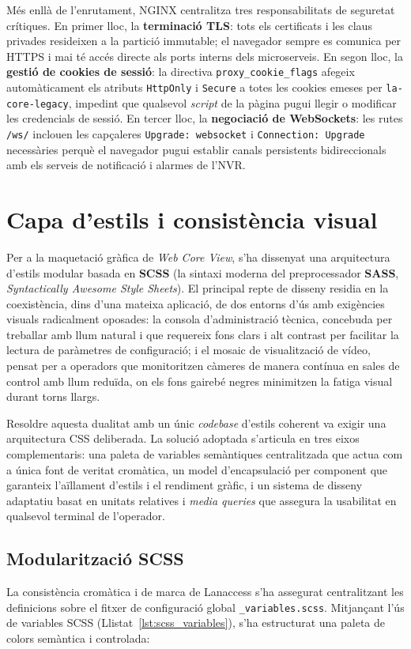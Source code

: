 Més enllà de l'enrutament, NGINX centralitza tres responsabilitats de seguretat crítiques. En primer lloc, la \textbf{terminació TLS}: tots els certificats i les claus privades resideixen a la partició immutable; el navegador sempre es comunica per HTTPS i mai té accés directe als ports interns dels microserveis. En segon lloc, la \textbf{gestió de cookies de sessió}: la directiva \texttt{proxy\_cookie\_flags} afegeix automàticament els atributs \texttt{HttpOnly} i \texttt{Secure} a totes les cookies emeses per \texttt{la-core-legacy}, impedint que qualsevol \textit{script} de la pàgina pugui llegir o modificar les credencials de sessió. En tercer lloc, la \textbf{negociació de WebSockets}: les rutes \texttt{/ws/} inclouen les capçaleres \texttt{Upgrade: websocket} i \texttt{Connection: Upgrade} necessàries perquè el navegador pugui establir canals persistents bidireccionals amb els serveis de notificació i alarmes de l'NVR.

\section{Capa d'estils i consistència visual}
Per a la maquetació gràfica de \textit{Web Core View}, s'ha dissenyat una arquitectura d'estils modular basada en \textbf{SCSS} (la sintaxi moderna del preprocessador \textbf{SASS}, \textit{Syntactically Awesome Style Sheets}). El principal repte de disseny residia en la coexistència, dins d'una mateixa aplicació, de dos entorns d'ús amb exigències visuals radicalment oposades: la consola d'administració tècnica, concebuda per treballar amb llum natural i que requereix fons clars i alt contrast per facilitar la lectura de paràmetres de configuració; i el mosaic de visualització de vídeo, pensat per a operadors que monitoritzen càmeres de manera contínua en sales de control amb llum reduïda, on els fons gairebé negres minimitzen la fatiga visual durant torns llargs.

Resoldre aquesta dualitat amb un únic \textit{codebase} d'estils coherent va exigir una arquitectura CSS deliberada. La solució adoptada s'articula en tres eixos complementaris: una paleta de variables semàntiques centralitzada que actua com a única font de veritat cromàtica, un model d'encapsulació per component que garanteix l'aïllament d'estils i el rendiment gràfic, i un sistema de disseny adaptatiu basat en unitats relatives i \textit{media queries} que assegura la usabilitat en qualsevol terminal de l'operador.

\subsection{Modularització SCSS}
La consistència cromàtica i de marca de Lanaccess s'ha assegurat centralitzant les definicions sobre el fitxer de configuració global \texttt{\_variables.scss}. Mitjançant l'ús de variables SCSS (Llistat~\ref{lst:scss_variables}), s'ha estructurat una paleta de colors semàntica i controlada:

